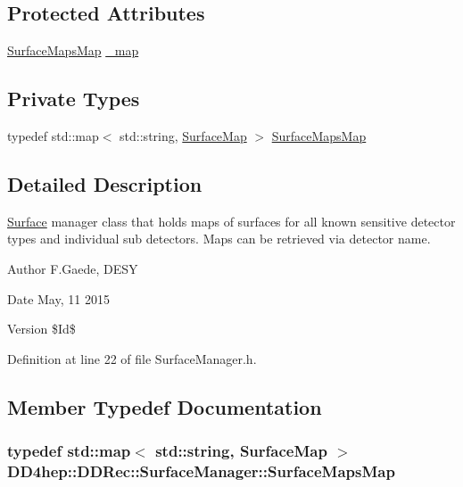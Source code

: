 \subsection*{Protected Attributes}
\begin{DoxyCompactItemize}
\item 
\hyperlink{class_d_d4hep_1_1_d_d_rec_1_1_surface_manager_af1cf671ee1a3a58ed722882a98970679}{SurfaceMapsMap} \hyperlink{class_d_d4hep_1_1_d_d_rec_1_1_surface_manager_a372c8c43ba149a5bf7d14da8ef63223d}{\_\-map}
\end{DoxyCompactItemize}
\subsection*{Private Types}
\begin{DoxyCompactItemize}
\item 
typedef std::map$<$ std::string, \hyperlink{namespace_d_d4hep_1_1_d_d_rec_a04db40c967eb23286f472ac1c17931d1}{SurfaceMap} $>$ \hyperlink{class_d_d4hep_1_1_d_d_rec_1_1_surface_manager_af1cf671ee1a3a58ed722882a98970679}{SurfaceMapsMap}
\end{DoxyCompactItemize}


\subsection{Detailed Description}
\hyperlink{class_d_d4hep_1_1_d_d_rec_1_1_surface}{Surface} manager class that holds maps of surfaces for all known sensitive detector types and individual sub detectors. Maps can be retrieved via detector name.

\begin{DoxyAuthor}{Author}
F.Gaede, DESY 
\end{DoxyAuthor}
\begin{DoxyDate}{Date}
May, 11 2015 
\end{DoxyDate}
\begin{DoxyVersion}{Version}
\$Id\$ 
\end{DoxyVersion}


Definition at line 22 of file SurfaceManager.h.

\subsection{Member Typedef Documentation}
\hypertarget{class_d_d4hep_1_1_d_d_rec_1_1_surface_manager_af1cf671ee1a3a58ed722882a98970679}{
\subsubsection[{SurfaceMapsMap}]{\setlength{\rightskip}{0pt plus 5cm}typedef std::map$<$ std::string, {\bf SurfaceMap} $>$ {\bf DD4hep::DDRec::SurfaceManager::SurfaceMapsMap}}}
\label{class_d_d4hep_1_1_d_d_rec_1_1_surface_manager_af1cf671ee1a3a58ed722882a98970679}


